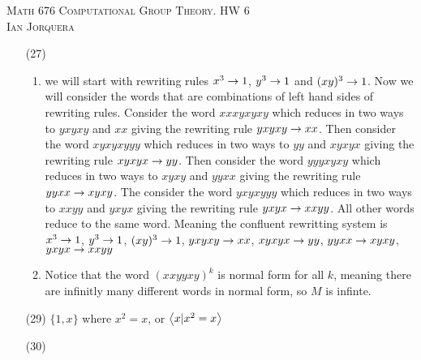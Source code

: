 \documentclass[12pt]{amsart}
\begin{document}
\begin{center}
   \textsc{Math 676 Computational Group Theory. HW 6\\ Ian Jorquera}
\end{center}
\vspace{1em}

\begin{itemize}
    \item[(27)] 
    \begin{enumerate}[label=(\alph*)]
        \item we will start with rewriting rules $x^3\rightarrow 1$, $y^3\rightarrow 1$ and 
        $(xy)^3\rightarrow 1$.
        Now we will consider the words that are combinations of left hand 
        sides of rewriting rules. Consider the word $xxxyxyxy$ which reduces 
        in two ways to $yxyxy$ and $xx$ giving the rewriting rule $yxyxy\rightarrow xx$.
        Then consider the word $xyxyxyyy$ which reduces 
        in two ways to $yy$ and $xyxyx$ giving the rewriting rule $xyxyx\rightarrow yy$.
        Then consider the word $yyyxyxy$ which reduces 
        in two ways to $xyxy$ and $yyxx$ giving the rewriting rule $yyxx\rightarrow xyxy$.
        The consider the word $yxyxyyy$ which reduces 
        in two ways to $xxyy$ and $yxyx$ giving the rewriting rule $yxyx\rightarrow xxyy$.
        All other words reduce to the same word. Meaning the confluent rewritting system is
        $x^3\rightarrow 1$, $y^3\rightarrow 1$, $(xy)^3\rightarrow 1$, $yxyxy\rightarrow xx$, $xyxyx\rightarrow yy$, $yyxx\rightarrow xyxy$, $yxyx\rightarrow xxyy$

        \item Notice that the word $(xxyyxy)^k$ is normal form for all $k$, meaning there 
        are infinitly many different words in normal form, so $M$ is infinte.
    \end{enumerate}
    \item[(29)] $\{1,x\}$ where $x^2=x$, or $\left\langle x|x^2=x \right\rangle$
    \item[(30)] 
\end{itemize}
\end{document}
